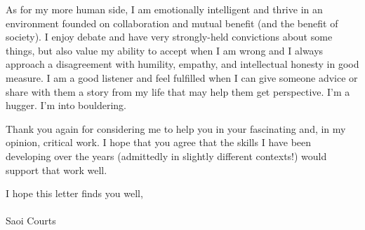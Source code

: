 \documentclass[12pt]{article} %
\begin{document}
As for my more human side, I am emotionally intelligent and thrive in an environment founded on collaboration and mutual benefit (and the benefit of society).
I enjoy debate and have very strongly-held convictions about some things, but also value my ability to accept when I am wrong and I always approach a disagreement with humility, empathy, and intellectual honesty in good measure.
I am a good listener and feel fulfilled when I can give someone advice or share with them a story from my life that may help them get perspective.
I'm a hugger. I'm into bouldering.

Thank you again for considering me to help you in your fascinating and, in my opinion, critical work.
I hope that you agree that the skills I have been developing over the years (admittedly in slightly different contexts!) would support that work well.

\vspace{0.25in}I hope this letter finds you well,\hfill\\\\

Saoi Courts
\end{document}
